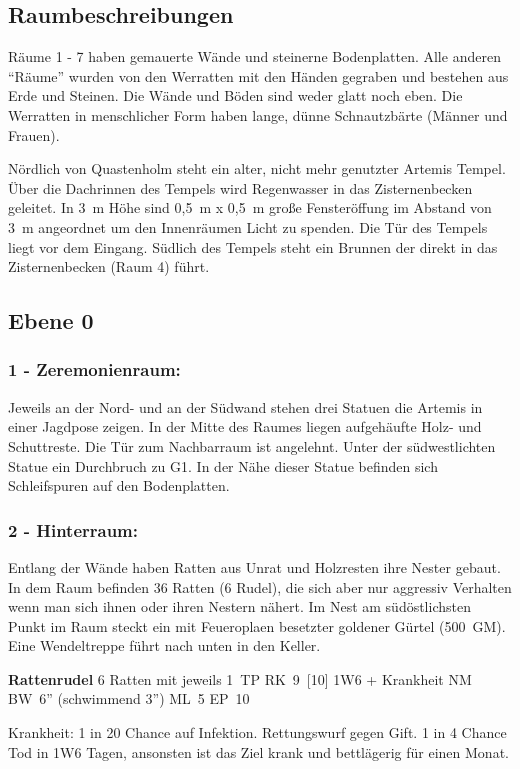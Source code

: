 \subsection{Raumbeschreibungen}

Räume 1 - 7 haben gemauerte Wände und steinerne Bodenplatten. Alle
anderen ``Räume'' wurden von den Werratten mit den Händen gegraben
und bestehen aus Erde und Steinen. Die Wände und Böden sind weder
glatt noch eben. Die Werratten in menschlicher Form haben lange,
dünne Schnautzbärte (Männer und Frauen).

Nördlich von Quastenholm steht ein alter, nicht mehr genutzter Artemis Tempel.
Über die Dachrinnen des Tempels wird Regenwasser in das Zisternenbecken
geleitet. In 3~m Höhe sind 0,5~m x 0,5~m große Fensteröffung im Abstand von 3~m
angeordnet um den Innenräumen Licht zu spenden. Die Tür des Tempels liegt vor
dem Eingang. Südlich des Tempels steht ein Brunnen der direkt in das
Zisternenbecken (Raum 4) führt.

\subsection{Ebene 0}

\subsubsection{1 - Zeremonienraum:} Jeweils an der Nord- und an der Südwand
stehen drei Statuen die Artemis in einer Jagdpose zeigen. In der Mitte des
Raumes liegen aufgehäufte Holz- und Schuttreste. Die Tür zum Nachbarraum ist
angelehnt. Unter der südwestlichten Statue ein Durchbruch zu G1. In der Nähe
dieser Statue befinden sich Schleifspuren auf den Bodenplatten.

\subsubsection{2 - Hinterraum:} Entlang der Wände haben Ratten aus Unrat und
Holzresten ihre Nester gebaut. In dem Raum befinden 36 Ratten (6 Rudel), die
sich aber nur aggressiv Verhalten wenn man sich ihnen oder ihren Nestern
nähert. Im Nest am südöstlichsten Punkt im Raum steckt ein mit Feueroplaen
besetzter goldener Gürtel (500~GM). Eine Wendeltreppe führt nach unten in den
Keller.

\textbf{Rattenrudel} 6 Ratten mit jeweils 1~TP RK~9~[10] 1W6 + Krankheit NM
BW~6'' (schwimmend 3'') ML~5 EP~10 

Krankheit: 1 in 20 Chance auf Infektion. Rettungswurf
gegen Gift. 1 in 4 Chance Tod in 1W6 Tagen, ansonsten ist das Ziel krank
und bettlägerig für einen Monat.

